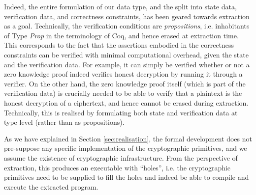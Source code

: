 \documentclass{llncs}
\begin{document}
Indeed, the entire formulation of our data type, and the split into
state data, verification data, and correctness constraints, has been
geared towards extraction as a goal. Technically, the verification
conditions are \emph{propositions}, i.e. inhabitants of Type
\emph{Prop} in the terminology of Coq, and hence erased at
extraction time. This corresponds to the fact that the assertions
embodied in the correctness constraints can be verified with minimal
computational overhead, given the state and the verification data.
For example, it can simply be verified whether or not a zero
knowledge proof indeed verifies honest decryption by running
it through a verifier.  On the other hand, the zero knowledge proof
itself (which is part of the verification data) is crucially needed
to be able to verify that a plaintext is the honest decryption of a
ciphertext, and hence cannot be erased during extraction.
Technically, this is realised by formulating both state and
verification data at type level (rather than as propositions). 

As we have explained in Section \ref{sec:realisation}, the formal
development does not pre-suppose any specific implementation of the
cryptographic primitives, and we assume the existence of
cryptographic infrastructure. From the perspective of extraction,
this produces an executable with ``holes'', i.e. the cryptographic
primitives need to be supplied to fill the holes and indeed be able
to compile and execute the extracted program.  
\end{document}
